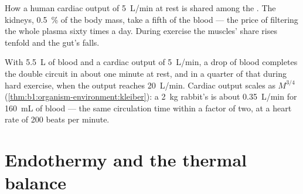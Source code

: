 \begin{omfigure}

{\small How a human cardiac output of \qty{5}{L/min} at rest is shared
among the . The kidneys, \qty{0.5}{\%} of the body mass, take a
fifth of the blood --- the price of filtering the whole plasma sixty
times a day. During exercise the muscles' share rises tenfold and the
gut's falls.}
\end{omfigure}

\begin{example}\label{ex:b1:mammal-organization:circtime}
With \qty{5.5}{L} of blood and a cardiac output of \qty{5}{L/min}, a
drop of blood completes the double circuit in about one minute at rest,
and in a quarter of that during hard exercise, when the output reaches
\qty{20}{L/min}. Cardiac output scales as $M^{3/4}$
(\cref{thm:b1:organism-environment:kleiber}): a \qty{2}{kg} rabbit's is
about \qty{0.35}{L/min} for \qty{160}{mL} of blood --- the same
circulation time within a factor of two, at a heart rate of
\qty{200}{} beats per minute.
\end{example}

\section{Endothermy and the thermal balance}

